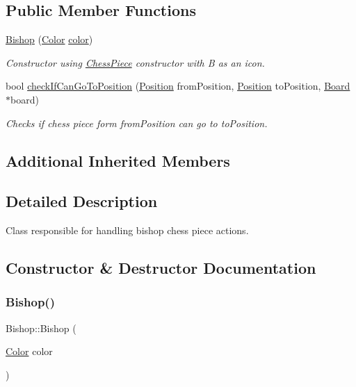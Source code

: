 \subsection*{Public Member Functions}
\begin{DoxyCompactItemize}
\item 
\hyperlink{classBishop_aaf9a04edcd25bfb97b86d6c5806e2b16}{Bishop} (\hyperlink{Enums_8h_ab87bacfdad76e61b9412d7124be44c1c}{Color} \hyperlink{classChessPiece_a8c8fc170e7c719ac2b71a93a56a38f01}{color})
\begin{DoxyCompactList}\small\item\em Constructor using \hyperlink{classChessPiece}{Chess\+Piece} constructor with \textquotesingle{}B\textquotesingle{} as an icon. \end{DoxyCompactList}\item 
bool \hyperlink{classBishop_aa9bdacc00fdb3a19035494e67240c55b}{check\+If\+Can\+Go\+To\+Position} (\hyperlink{classPosition}{Position} from\+Position, \hyperlink{classPosition}{Position} to\+Position, \hyperlink{classBoard}{Board} $\ast$board)
\begin{DoxyCompactList}\small\item\em Checks if chess piece form from\+Position can go to to\+Position. \end{DoxyCompactList}\end{DoxyCompactItemize}
\subsection*{Additional Inherited Members}


\subsection{Detailed Description}
Class responsible for handling bishop chess piece actions. 

\subsection{Constructor \& Destructor Documentation}
\mbox{\label{classBishop_aaf9a04edcd25bfb97b86d6c5806e2b16}} 
\subsubsection{\texorpdfstring{Bishop()}{Bishop()}}
{\footnotesize\ttfamily Bishop\+::\+Bishop (\begin{DoxyParamCaption}\item[{\hyperlink{Enums_8h_ab87bacfdad76e61b9412d7124be44c1c}{Color}}]{color }\end{DoxyParamCaption})\hspace{0.3cm}{\ttfamily [inline]}}



